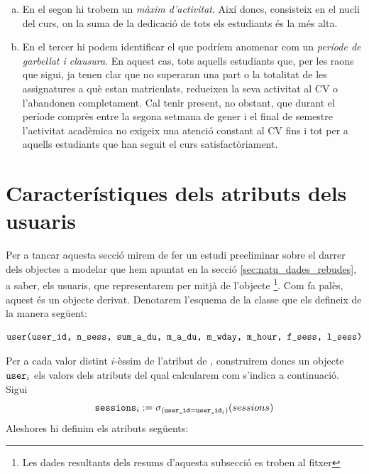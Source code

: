 \documentclass[
	a4paper,
	twoside,
	justified
]{tufte-book}
\begin{document}
\begin{enumerate}[(1)]
\begin{enumerate}[(a)]
	\item En el segon hi trobem un \emph{màxim d'activitat}. Així doncs, consisteix en el nucli del curs, on la suma de la dedicació de tots els estudiants és la més alta.
	
	\item En el tercer hi podem identificar el que podríem anomenar com un \emph{període de garbellat i clausura}. En aquest cas, tots aquells estudiants que, per les raons que sigui, ja tenen clar que no superaran una part o la totalitat de les assignatures a què estan matriculats, redueixen la seva activitat al CV o l'abandonen completament. Cal tenir present, no obstant, que durant el període comprès entre la segona setmana de gener i el final de semestre l'activitat acadèmica no exigeix una atenció constant al CV fins i tot per a aquells estudiants que han seguit el curs satisfactòriament.      
	\end{enumerate}
\end{enumerate}

\section{Característiques dels atributs dels usuaris}
\label{sec:user_stats}

Per a tancar aquesta secció mirem de fer un estudi preeliminar sobre el darrer dels objectes a modelar que hem apuntat en la secció \ref{sec:natu_dades_rebudes}, a saber, els usuaris, que representarem per mitjà de l'objecte \footnote{Les dades resultants dels resums d'aquesta subsecció es troben al fitxer }. Com fa palès, aquest és un objecte derivat. Denotarem l'esquema de la classe que els defineix de la manera següent:

\begin{fullwidth}
$$
\texttt{user(user\_id, n\_sess, sum\_a\_du, m\_a\_du, m\_wday, m\_hour, f\_sess, l\_sess)}
$$
\end{fullwidth}

Per a cada valor distint $i$-èssim de l'atribut  de , construirem doncs un objecte $\texttt{user}_i$ els valors dels atributs del qual calcularem com s'indica a continuació. Sigui 
$$
	\texttt{sessions}_i := \sigma_{(\texttt{user\_id} = \texttt{user\_id}_i)}(sessions)
$$ 
Aleshores hi definim els atributs següents:
\end{document}
